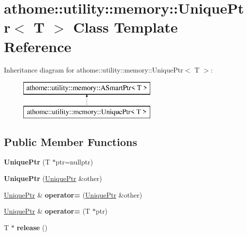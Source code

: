 \hypertarget{classathome_1_1utility_1_1memory_1_1_unique_ptr}{}\section{athome\+:\+:utility\+:\+:memory\+:\+:Unique\+Ptr$<$ T $>$ Class Template Reference}
\label{classathome_1_1utility_1_1memory_1_1_unique_ptr}
Inheritance diagram for athome\+:\+:utility\+:\+:memory\+:\+:Unique\+Ptr$<$ T $>$\+:\begin{figure}[H]
\begin{center}
\leavevmode
\includegraphics[height=2.000000cm]{classathome_1_1utility_1_1memory_1_1_unique_ptr}
\end{center}
\end{figure}
\subsection*{Public Member Functions}
\begin{DoxyCompactItemize}
\item 
\mbox{\label{classathome_1_1utility_1_1memory_1_1_unique_ptr_a86aa399766e5f84a525973505b467117}} 
{\bfseries Unique\+Ptr} (T $\ast$ptr=nullptr)
\item 
\mbox{\label{classathome_1_1utility_1_1memory_1_1_unique_ptr_a2d85cfac2edf39c34eacc944996e6e3c}} 
{\bfseries Unique\+Ptr} (\mbox{\hyperlink{classathome_1_1utility_1_1memory_1_1_unique_ptr}{Unique\+Ptr}} \&other)
\item 
\mbox{\label{classathome_1_1utility_1_1memory_1_1_unique_ptr_a6c693fc0f5458dfc550cd08e4255e21f}} 
\mbox{\hyperlink{classathome_1_1utility_1_1memory_1_1_unique_ptr}{Unique\+Ptr}} \& {\bfseries operator=} (\mbox{\hyperlink{classathome_1_1utility_1_1memory_1_1_unique_ptr}{Unique\+Ptr}} \&other)
\item 
\mbox{\label{classathome_1_1utility_1_1memory_1_1_unique_ptr_abe9c1a286f4da8e9d4810427f94f51f9}} 
\mbox{\hyperlink{classathome_1_1utility_1_1memory_1_1_unique_ptr}{Unique\+Ptr}} \& {\bfseries operator=} (T $\ast$ptr)
\item 
\mbox{\label{classathome_1_1utility_1_1memory_1_1_unique_ptr_aa755509edb33f8a74f25945f46747a02}} 
T $\ast$ {\bfseries release} ()
\end{DoxyCompactItemize}
